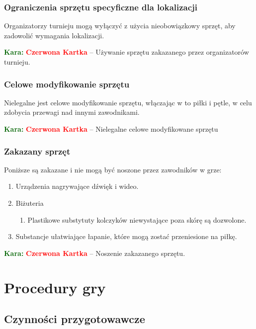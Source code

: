 \documentclass[11pt,a4paper]{article}
\newcommand\redcard[1]{\bgroup\textcolor{darkgreen}{\textbf{Kara: }}\bgroup\textcolor{red}{\textbf{Czerwona Kartka}} -- #1}
\begin{document}
\subsubsection{Ograniczenia sprzętu specyficzne dla lokalizacji}
Organizatorzy turnieju mogą wyłączyć z użycia nieobowiązkowy sprzęt, aby zadowolić wymagania lokalizacji.

\redcard{Używanie sprzętu zakazanego przez organizatorów turnieju.}

\subsubsection{Celowe modyfikowanie sprzętu}
Nielegalne jest celowe modyfikowanie sprzętu, włączając w to piłki i pętle, w celu zdobycia przewagi nad innymi zawodnikami.

\redcard{Nielegalne celowe modyfikowane sprzętu}

\subsubsection{Zakazany sprzęt}
Poniższe są zakazane i nie mogą być noszone przez zawodników w grze:
\begin{enumerate}
  \item Urządzenia nagrywające dźwięk i wideo.
  \item Biżuteria
  \begin{enumerate}
    \item Plastikowe substytuty kolczyków niewystające poza skórę są dozwolone.
  \end{enumerate}
  \item Substancje ułatwiające łapanie, które mogą zostać przeniesione na piłkę.
\end{enumerate}

\redcard{Noszenie zakazanego sprzętu.}

\section{Procedury gry}

\subsection{Czynności przygotowawcze}
\end{document}
